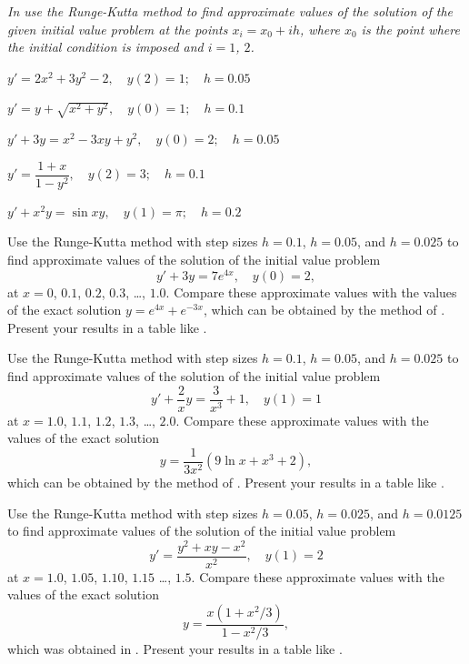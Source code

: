 \noindent
\emph{In  use the Runge-Kutta
method to
find approximate values of the solution of the given initial value
problem at the points $x_i=x_0+ih$, where $x_0$ is the point where
the initial condition is imposed and $i=1$, $2$.}


\begin{exerciselist}
\item\label{exer:3.3.1}\Cex
$y'=2x^2+3y^2-2,\quad y(2)=1;\quad h=0.05$
\item\label{exer:3.3.2}\Cex
$y'=y+\sqrt{x^2+y^2},\quad y(0)=1;\quad h=0.1$
\item\label{exer:3.3.3}\Cex
$y'+3y=x^2-3xy+y^2,\quad y(0)=2;\quad h=0.05$
\item\label{exer:3.3.4}\Cex
$y'=\dfrac{1+x}{1-y^2},\quad y(2)=3;\quad h=0.1$
\item\label{exer:3.3.5}\Cex
$y'+x^2y=\sin xy,\quad y(1)=\pi;\quad h=0.2$

\item\label{exer:3.3.6}\Cex
Use  the Runge-Kutta method with step sizes $h=0.1$, $h=0.05$, and
$h=0.025$ to
find approximate values of the solution of the initial value problem
\[
y'+3y=7e^{4x},\quad y(0)=2,
\]
at $x=0$, $0.1$, $0.2$, $0.3$, \dots, $1.0$. Compare these approximate
values with the
values of the exact solution $y=e^{4x}+e^{-3x}$, which can be obtained
by the method of . Present your results in a
table like .


\item\label{exer:3.3.7}\Cex
Use the Runge-Kutta method with step sizes $h=0.1$, $h=0.05$, and
$h=0.025$ to find approximate values of the solution of the initial
value problem
\[
y'+\frac{2}{x}y=\frac{3}{x^3}+1,\quad y(1)=1
\]
at $x=1.0$, $1.1$, $1.2$, $1.3$, \dots, $2.0$. Compare these approximate
values
with the values of the exact solution
\[
y=\frac{1}{3x^2}(9\ln x+x^3+2),
\]
which can be obtained by the method of . Present
your results in a table like .

\item\label{exer:3.3.8}\Cex
Use the Runge-Kutta method with step sizes $h=0.05$, $h=0.025$, and
$h=0.0125$ to find approximate values of the solution of the initial
value problem
\[
y'=\frac{y^2+xy-x^2}{x^2},\quad y(1)=2
\]
at $x=1.0$, $1.05$, $1.10$, $1.15$ \dots, $1.5$. Compare these approximate
values
with the values of the exact solution
\[
y=\frac{x(1+x^2/3)}{1-x^2/3},
\]
which was obtained in . Present your results in
a table like .


\end{exerciselist}
